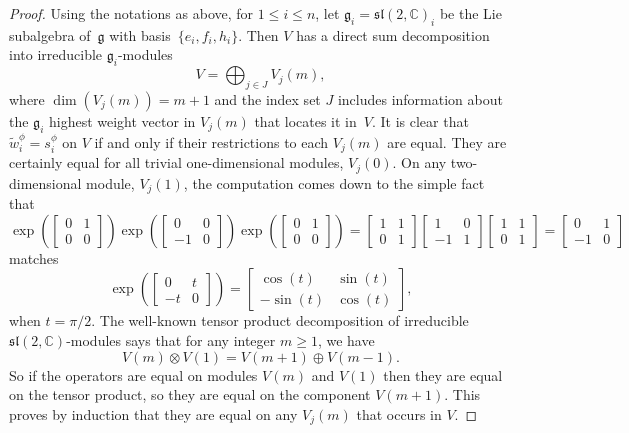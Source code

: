 \documentclass[11pt]{article}
\numberwithin{equation}{section}
\numberwithin{equation}{section}
\def\C{{\mathbb C}}
\def\tw{{\widetilde{w}}}
\def\bm{\begin{bmatrix}}
\def\ebm{\end{bmatrix}}
\def\fg{\mathfrak{g}}
\def\fsl{\mathfrak{sl}}
\begin{document}
\begin{proof}Using the notations as above, for $1\leq i\leq n$, let $\fg_i = \fsl(2,\C)_i$ be the Lie subalgebra of~$\fg$ with basis~$\{e_i,f_i,h_i\}$. Then $V$ has a direct sum decomposition into irreducible $\fg_i$-modules
\[V = \bigoplus_{j\in J} V_j(m),\]
where $\dim(V_j(m)) = m+1$ and the index set $J$ includes information about the $\fg_i$ highest weight vector in $V_j(m)$ that locates it in~$V$.
It is clear that $\tw_i^\phi = s_i^\phi$ on $V$ if and only if their restrictions to each $V_j(m)$ are equal. They are certainly equal for all trivial one-dimensional modules, $V_j(0)$. On any two-dimensional module, $V_j(1)$, the computation comes down to the simple fact that
\[\exp\left( \bm 0&1\\0&0\ebm \right) \exp\left( \bm 0&0\\-1&0\ebm \right) \exp\left( \bm 0&1\\0&0\ebm \right)
= \bm 1&1\\0&1\ebm \bm 1&0\\-1&1\ebm \bm 1&1\\0&1\ebm = \bm 0&1\\-1&0\ebm \]
matches
\[\exp\left( \bm 0&t\\-t&0\ebm \right) = \bm \cos(t)&\sin(t) \\-\sin(t)&\cos(t) \ebm,\]
when $t = \pi/2$. The well-known tensor product decomposition of irreducible $\fsl(2,\C)$-modules says that for any integer $m\geq 1$, we have
\[V(m)\otimes V(1) = V(m+1) \oplus V(m-1).\]
So if the operators are equal on modules $V(m)$ and $V(1)$ then they are equal on the tensor product, so they are equal on the component
$V(m+1)$. This proves by induction that they are equal on any $V_j(m)$ that occurs in $V$.
\end{proof}
\end{document}
